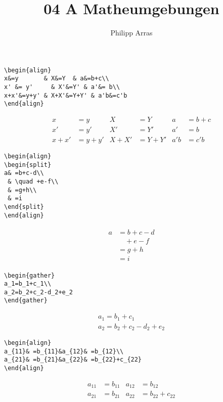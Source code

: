 \documentclass[11pt,a4paper]{scrartcl}
\author{Philipp Arras}
\title{04 A Matheumgebungen}
\begin{document}
\maketitle

\begin{lstlisting}
\begin{align}
x&=y       & X&=Y  & a&=b+c\\
x' &= y'     & X'&=Y' & a'&= b\\
x+x'&=y+y' & X+X'&=Y+Y' & a'b&=c'b
\end{align}
\end{lstlisting}
\begin{align}
x&=y       & X&=Y  & a&=b+c\\
x' &= y'    &  X'&=Y' & a'&= b\\
x+x'&=y+y' & X+X'&=Y+Y' & a'b&=c'b
\end{align}

\begin{lstlisting}
\begin{align}
\begin{split}
a& =b+c-d\\
 & \quad +e-f\\
 & =g+h\\
 & =i
\end{split}
\end{align}
\end{lstlisting}
\begin{align}
\begin{split}
a& =b+c-d\\
 & \quad +e-f\\
 & =g+h\\
 & =i
\end{split}
\end{align}

\begin{lstlisting}
\begin{gather}
a_1=b_1+c_1\\
a_2=b_2+c_2-d_2+e_2
\end{gather}
\end{lstlisting}
\begin{gather}
a_1=b_1+c_1\\
a_2=b_2+c_2-d_2+e_2
\end{gather}

\begin{lstlisting}
\begin{align}
a_{11}& =b_{11}&a_{12}& =b_{12}\\
a_{21}& =b_{21}&a_{22}& =b_{22}+c_{22}
\end{align}
\end{lstlisting}
\begin{align}
a_{11}& =b_{11}&a_{12}& =b_{12}\\
a_{21}& =b_{21}&a_{22}& =b_{22}+c_{22}
\end{align}
\end{document}
